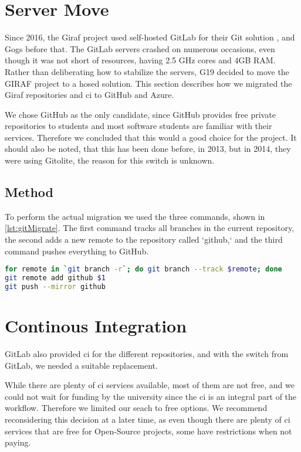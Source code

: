 \section{Server Move}

Since 2016\cite{SW611F16}, the Giraf project used self-hosted GitLab for their Git solution , and Gogs before that\cite{SW603F15}. The GitLab servers crashed on numerous occasions, even though it was not short of resources, having 2.5 GHz cores and 4GB RAM. Rather than deliberating how to stabilize the servers, \gls{G19} decided to move the GIRAF project to a hosed solution. This section describes how we migrated the Giraf repositories and \gls{ci} to GitHub and Azure.

We chose GitHub as the only candidate, since GitHub provides free private repositories to students and most software students are familiar with their services. Therefore we concluded that this would a good choice for the project. It should also be noted, that this has been done before, in 2013\cite{SW601F13}, but in 2014, they were using Gitolite\cite{SW613F14}, the reason for this switch is unknown.

\subsection{Method}

To perform the actual migration we used the three commands, shown in \autoref{lst:gitMigrate}. The first command tracks all branches in the current repository, the second adds a new remote to the repository called `github,` and the third command pushes everything to GitHub.

\begin{lstlisting}[language=bash,label={lst:gitMigrate},caption={Git Migration code}]
for remote in `git branch -r`; do git branch --track $remote; done
git remote add github $1
git push --mirror github
\end{lstlisting}

\section{Continous Integration}

GitLab also provided \gls{ci} for the different repositories, and with the switch from GitLab, we needed a suitable replacement.

While there are plenty of \gls{ci} services available, most of them are not free, and we could not wait for funding by the university since the \gls{ci} is an integral part of the workflow. Therefore we limited our seach to free options.  We recommend reconsidering this decision at a later time, as even though there are plenty of \gls{ci} services that are free for Open-Source projects, some have restrictions when not paying.

